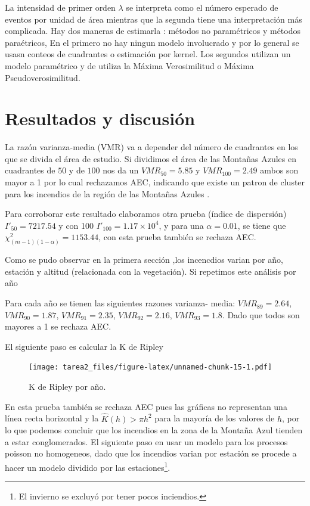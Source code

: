 \documentclass[12,]{article}
\let\rmarkdownfootnote\footnote%
\def\footnote{\protect\rmarkdownfootnote}
\begin{document}
La intensidad de primer orden $\lambda$ se interpreta como el número
esperado de eventos por unidad de área mientras que la segunda tiene una
interpretación más complicada. Hay dos maneras de estimarla : métodos no
paramétricos y métodos paraétricos, En el primero no hay ningun modelo
involucrado y por lo general se usasn conteos de cuadrantes o estimación
por kernel. Los segundos utilizan un modelo paramétrico y de utiliza la
Máxima Verosimilitud o Máxima Pseudoverosimilitud.

\section{Resultados y discusión}\label{resultados-y-discusion}

La razón varianza-media (VMR) va a depender del número de cuadrantes en
los que se divida el área de estudio. Si dividimos el área de las
Montañas Azules en cuadrantes de $50$ y de $100$ nos da un
$VMR_{50} = 5.85$ y $VMR_{100} = 2.49$ ambos son mayor a 1 por lo cual
rechazamos AEC, indicando que existe un patron de cluster para los
incendios de la región de las Montañas Azules .

Para corroborar este resultado elaboramos otra prueba (índice de
dispersión) $I'_{50} = 7217.54$ y con 100
$I'_{100} = 1.17\times 10^{4}$, y para una $\alpha = 0.01$, se tiene que
$\chi^2_{(m-1)(1 - \alpha)} = 1153.44$, con esta prueba también se
rechaza AEC.

Como se pudo observar en la primera sección ,los incencdios varian por
año, estación y altitud (relacionada con la vegetación). Si repetimos
este análisis por año

Para cada año se tienen las siguientes razones varianza- media:
$VMR_{89} = 2.64$, $VMR_{90} = 1.87$, $VMR_{91} = 2.35$,
$VMR_{92} = 2.16$, $VMR_{93} = 1.8$. Dado que todos son mayores a 1 se
rechaza AEC.

El siguiente paso es calcular la K de Ripley

\begin{figure}[H]
\centering
\texttt{[image: tarea2\_files/figure-latex/unnamed-chunk-15-1.pdf]}
\caption{K de Ripley por año.}
\end{figure}

En esta prueba también se rechaza AEC pues las gráficas no representan
una línea recta horizontal y la $\hat{K}(h) > \pi h^2$ para la mayoría
de los valores de $h$, por lo que podemos concluir que los incendios en
la zona de la Montaña Azul tienden a estar conglomerados. El siguiente
paso en usar un modelo para los procesos poisson no homogeneos, dado que
los incendios varian por estación se procede a hacer un modelo dividido
por las estaciones\footnote{El invierno se excluyó por tener pocos
  inciendios.}.
\end{document}
